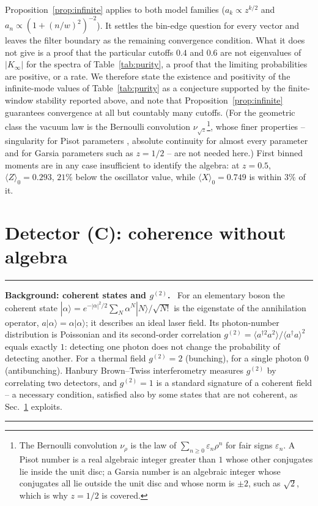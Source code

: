 \documentclass[11pt,a4paper]{article}
\newcommand{\ket}[1]{|#1\rangle}
\newenvironment{background}[1]{\par\medskip\noindent\hrule\smallskip\noindent\textbf{Background: #1.}\ \ignorespaces}{\par\smallskip\noindent\hrule\medskip}
\begin{document}
Proposition~\ref{prop:infinite} applies to both model families ($a_k\propto z^{k/2}$ and $a_n\propto(1+(n/w)^2)^{-2}$). It settles the bin-edge question for every vector and leaves the filter boundary as the remaining convergence condition. What it does not give is a proof that the particular cutoffs $0.4$ and $0.6$ are not eigenvalues of $|K_\infty|$ for the spectra of Table~\ref{tab:purity}, a proof that the limiting probabilities are positive, or a rate. We therefore state the existence and positivity of the infinite-mode values of Table~\ref{tab:purity} as a conjecture supported by the finite-window stability reported above, and note that Proposition~\ref{prop:infinite} guarantees convergence at all but countably many cutoffs. (For the geometric class the vacuum law is the Bernoulli convolution $\nu_{\sqrt z}$\footnote{The Bernoulli convolution $\nu_\rho$ is the law of $\sum_{n\ge0}\varepsilon_n\rho^n$ for fair signs $\varepsilon_n$. A Pisot number is a real algebraic integer greater than $1$ whose other conjugates lie inside the unit disc; a Garsia number is an algebraic integer whose conjugates all lie outside the unit disc and whose norm is $\pm2$, such as $\sqrt2$, which is why $z=1/2$ is covered.}, whose finer properties -- singularity for Pisot parameters \cite{Erdos1939}, absolute continuity for almost every parameter \cite{Solomyak1995,Shmerkin2014} and for Garsia parameters such as $z=1/2$ \cite{Garsia1962} -- are not needed here.) First binned moments are in any case insufficient to identify the algebra: at $z=0.5$, $\langle Z\rangle_0=0.293$, $21\%$ below the oscillator value, while $\langle X\rangle_0=0.749$ is within $3\%$ of it.


\section{Detector (C): coherence without algebra}
\label{sec:initial}

\begin{background}{coherent states and $g^{(2)}$}
For an elementary boson the coherent state $\ket\alpha=e^{-|\alpha|^2/2}\sum_N\alpha^N\ket N/\sqrt{N!}$ is the eigenstate of the annihilation operator, $a\ket\alpha=\alpha\ket\alpha$; it describes an ideal laser field. Its photon-number distribution is Poissonian and its second-order correlation $g^{(2)}=\langle a^{\dagger2}a^2\rangle/\langle a^\dagger a\rangle^2$ equals exactly $1$: detecting one photon does not change the probability of detecting another. For a thermal field $g^{(2)}=2$ (bunching), for a single photon $0$ (antibunching). Hanbury Brown--Twiss interferometry measures $g^{(2)}$ by correlating two detectors, and $g^{(2)}=1$ is a standard signature of a coherent field -- a necessary condition, satisfied also by some states that are not coherent, as Sec.~\ref{sec:initial} exploits.
\end{background}
\end{document}
